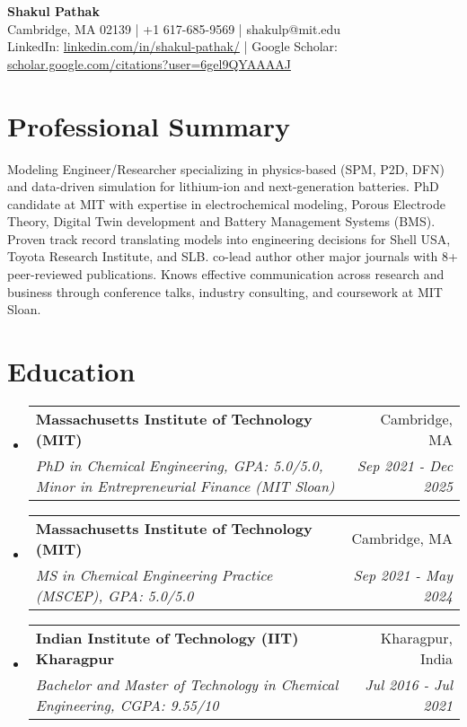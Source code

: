 \documentclass[letterpaper,11pt]{article}
\makeatletter
\newcommand{\resumeSubheading}[4]{
  \vspace{-1pt}\item
    \begin{tabular*}{0.97\textwidth}{l@{\extracolsep{\fill}}r}
      \textbf{#1} & #2 \\
      \textit{\small#3} & \textit{\small #4} \\
    \end{tabular*}\vspace{-6pt}
}
\newcommand{\resumeSubHeadingListStart}{\begin{itemize}[leftmargin=*]}
\newcommand{\resumeSubHeadingListEnd}{\end{itemize}}
\makeatother
\begin{document}
\begin{center}
  \textbf{\Large Shakul Pathak} \\
  \vspace{2pt}
  Cambridge, MA 02139 | +1 617-685-9569 | shakulp@mit.edu \\
 LinkedIn: \href{https://www.linkedin.com/in/shakul-pathak/}{linkedin.com/in/shakul-pathak/} | Google Scholar:  \href{https://scholar.google.com/citations?user=6gel9QYAAAAJ}{scholar.google.com/citations?user=6gel9QYAAAAJ}
\end{center}
\vspace{-8pt}

\section{Professional Summary}
\vspace{-2pt}
Modeling Engineer/Researcher specializing in physics-based (SPM, P2D, DFN) and data-driven simulation for lithium-ion and next-generation batteries. PhD candidate at MIT with expertise in electrochemical modeling, Porous Electrode Theory, Digital Twin development and Battery Management Systems (BMS). Proven track record translating models into engineering decisions for Shell USA, Toyota Research Institute, and SLB. co-lead author other major journals with 8+ peer-reviewed publications. Knows effective communication across research and business through conference talks, industry consulting, and coursework at MIT Sloan.

\section{Education}
  \resumeSubHeadingListStart
    \resumeSubheading
      {Massachusetts Institute of Technology (MIT)}{Cambridge, MA}
      {PhD in Chemical Engineering, GPA: 5.0/5.0, Minor in Entrepreneurial Finance (MIT Sloan)}{Sep 2021 - Dec 2025}
    \resumeSubheading
      {Massachusetts Institute of Technology (MIT)}{Cambridge, MA}
      {MS in Chemical Engineering Practice (MSCEP), GPA: 5.0/5.0}{Sep 2021 - May 2024}
    \resumeSubheading
      {Indian Institute of Technology (IIT) Kharagpur}{Kharagpur, India}
      {Bachelor and Master of Technology in Chemical Engineering, CGPA: 9.55/10}{Jul 2016 - Jul 2021}
  \resumeSubHeadingListEnd

\end{document}
